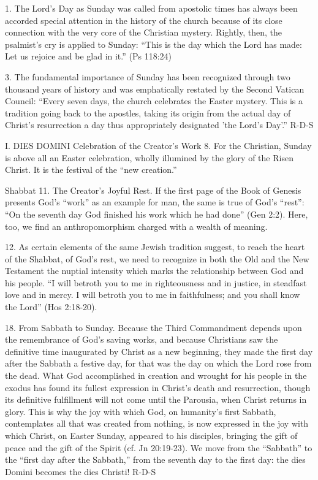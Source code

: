 \documentclass[oneside]{book}
\begin{document}
1. The Lord's Day  as Sunday was called from apostolic times  has always been
accorded special attention in the history of the church because of its close
connection with the very core of the Christian mystery. Rightly, then, the
psalmist's cry is applied to Sunday: ``This is the day which the Lord has made:
Let us rejoice and be glad in it.'' (Ps 118:24)

3. The fundamental importance of Sunday has been recognized through two thousand
years of history and was emphatically restated by the Second Vatican Council:
``Every seven days, the church celebrates the Easter mystery. This is a
tradition going back to the apostles, taking its origin from the actual day of
Christ's resurrection  a day thus appropriately designated 'the Lord's Day'.''
R-D-S

I. DIES DOMINI
Celebration of the Creator's Work
8. For the Christian, Sunday is above all an Easter celebration, wholly
illumined by the glory of the Risen Christ. It is the festival of the ``new
creation.''

Shabbat
11. The Creator's Joyful Rest. If the first page of the Book of Genesis presents
God's ``work'' as an example for man, the same is true of God's ``rest'': ``On
the seventh day God finished his work which he had done'' (Gen 2:2). Here, too,
we find an anthropomorphism charged with a wealth of meaning.

12. As certain elements of the same Jewish tradition suggest, to reach the heart
of the Shabbat, of God's rest, we need to recognize in both the Old and the New
Testament the nuptial intensity which marks the relationship between God and his
people. ``I will betroth you to me in righteousness and in justice, in steadfast
love and in mercy. I will betroth you to me in faithfulness; and you shall know
the Lord'' (Hos 2:18-20).


18. From Sabbath to Sunday. Because the Third Commandment depends upon the
remembrance of God's saving works, and because Christians saw the definitive
time inaugurated by Christ as a new beginning, they made the first day after the
Sabbath a festive day, for that was the day on which the Lord rose from the
dead. What God accomplished in creation and wrought for his people in the exodus
has found its fullest expression in Christ's death and resurrection, though its
definitive fulfillment will not come until the Parousia, when Christ returns in
glory. This is why the joy with which God, on humanity's first Sabbath,
contemplates all that was created from nothing, is now expressed in the joy with
which Christ, on Easter Sunday, appeared to his disciples, bringing the gift of
peace and the gift of the Spirit (cf. Jn 20:19-23). We move from the ``Sabbath''
to the ``first day after the Sabbath,'' from the seventh day to the first day:
the dies Domini becomes the dies Christi!
R-D-S
\end{document}
